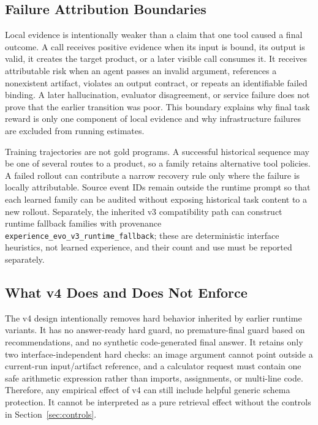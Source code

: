 \documentclass[10pt]{article}
\begin{document}
\subsection{Failure Attribution Boundaries}
Local evidence is intentionally weaker than a claim that one tool caused a final outcome. A call receives positive evidence when its input is bound, its output is valid, it creates the target product, or a later visible call consumes it. It receives attributable risk when an agent passes an invalid argument, references a nonexistent artifact, violates an output contract, or repeats an identifiable failed binding. A later hallucination, evaluator disagreement, or service failure does not prove that the earlier transition was poor. This boundary explains why final task reward is only one component of local evidence and why infrastructure failures are excluded from running estimates.

Training trajectories are not gold programs. A successful historical sequence may be one of several routes to a product, so a family retains alternative tool policies. A failed rollout can contribute a narrow recovery rule only where the failure is locally attributable. Source event IDs remain outside the runtime prompt so that each learned family can be audited without exposing historical task content to a new rollout. Separately, the inherited v3 compatibility path can construct runtime fallback families with provenance \texttt{experience\_evo\_v3\_runtime\_fallback}; these are deterministic interface heuristics, not learned experience, and their count and use must be reported separately.

\subsection{What v4 Does and Does Not Enforce}
The v4 design intentionally removes hard behavior inherited by earlier runtime variants. It has no answer-ready hard guard, no premature-final guard based on recommendations, and no synthetic code-generated final answer. It retains only two interface-independent hard checks: an image argument cannot point outside a current-run input/artifact reference, and a calculator request must contain one safe arithmetic expression rather than imports, assignments, or multi-line code. Therefore, any empirical effect of v4 can still include helpful generic schema protection. It cannot be interpreted as a pure retrieval effect without the controls in Section~\ref{sec:controls}.
\end{document}
